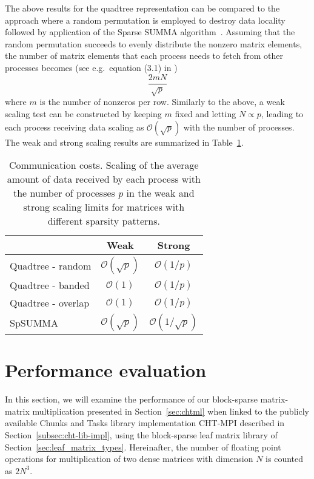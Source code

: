 \documentclass{elsarticle}
\begin{document}
The above results for the quadtree representation can be compared to
the approach where a random permutation is employed to destroy data
locality followed by application of the Sparse SUMMA
algorithm~\cite{SparseSUMMA2008}.  Assuming that the random
permutation succeeds to evenly distribute the nonzero matrix elements,
the number of matrix elements that each process needs to fetch from
other processes becomes (see e.g.~equation (3.1) in
\cite{BulucGilbert2012})
\begin{equation} \label{eq:sqrtp_equation}
  \frac{2mN}{\sqrt{p}} \end{equation}
where $m$ is the number of nonzeros per row. Similarly to the above, a
weak scaling test can be constructed by keeping $m$ fixed and letting
$N \propto p$, leading to each process receiving data scaling as
$\mathcal{O}(\sqrt{p})$ with the number of processes. The weak and
strong scaling results are summarized in
Table~\ref{tbl:weak_and_strong_scaling}.




\begin{table}
\begin{center}
\begin{tabular}{lcc}
  \hline
  & Weak & Strong \\
  \hline
  \hline
  Quadtree - random  & $\mathcal{O}(\sqrt{p})$   & $\mathcal{O}(1/p)$ \\
  Quadtree - banded  & $\mathcal{O}(1)$          & $\mathcal{O}(1/p)$ \\
  Quadtree - overlap & $\mathcal{O}(1)$          & $\mathcal{O}(1/p)$ \\
  \hline
  SpSUMMA &  $\mathcal{O}(\sqrt{p})$ & $\mathcal{O}(1/\sqrt{p})$\\
  \hline
\end{tabular}
\end{center}
\caption{Communication costs. Scaling of the average amount of data received
  by each process with the number of processes $p$ in the weak and
  strong scaling limits for matrices with different sparsity
  patterns.  \label{tbl:weak_and_strong_scaling}}
\end{table}

\section{Performance evaluation}\label{sec:performance}
In this section, we will examine the performance of our block-sparse
matrix-matrix multiplication presented in Section~\ref{sec:chtml} when
linked to the publicly available Chunks and Tasks library
implementation CHT-MPI described in Section~\ref{subsec:cht-lib-impl},
using the block-sparse leaf matrix library of
Section~\ref{sec:leaf_matrix_types}.  Hereinafter, the number of
floating point operations for multiplication of two dense matrices
with dimension $N$ is counted as $2N^3$.
\end{document}
